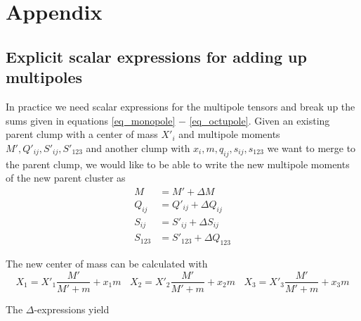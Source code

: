 \section{Appendix}

\subsection{Explicit scalar expressions for adding up multipoles}

In practice we need scalar expressions for the multipole tensors and break up the sums given in equations \ref{eq_monopole} $-$ \ref{eq_octupole}. Given an existing parent clump with a center of mass $X'_{i}$ and multipole moments $M', Q'_{i j}, S'_{i j}, S'_{123}$ and another clump with $x_i, m, q_{i j}, s_{i j}, s_{123}$ we want to merge to the parent clump, we would like to be able to write the new multipole moments of the new parent cluster as
\begin{align}
M &= M' + \Delta M \\
Q_{ij} &= Q'_{ij} + \Delta Q_{ij}\\
S_{ij} &= S'_{ij} + \Delta S_{ij}\\
S_{123} &= S'_{123} + \Delta Q_{123}
\end{align}

The new center of mass can be calculated with
\begin{equation}
X_{1} = X'_{1} \frac{M'}{M'+m} + x_1 m ~~~~ X_{2} = X'_{2} \frac{M'}{M'+m} + x_2 m ~~~~ X_{3} = X'_{3} \frac{M'}{M'+m} + x_3 m
\end{equation}

The $\Delta$-expressions yield

